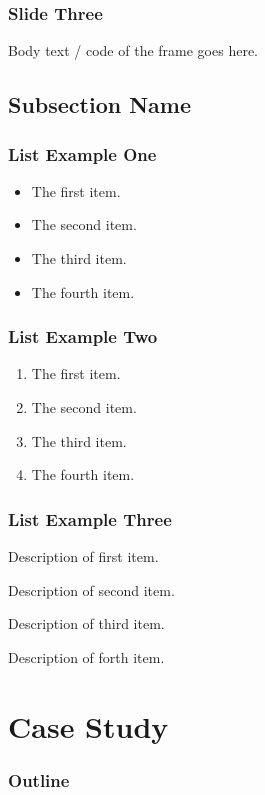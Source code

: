 \documentclass{beamer}
\begin{document}
\begin{frame}
\frametitle{Slide Three} 
Body text / code of the frame goes here. 
\end{frame} 


\subsection{Subsection Name}

\begin{frame}
\frametitle{List Example One}
\begin{itemize} 
\item The first item.
\item The second item.
\item The third item.
\item The fourth item.
\end{itemize}
\end{frame}

\begin{frame}
\frametitle{List Example Two}
\begin{enumerate} 
\item The first item.
\item The second item.
\item The third item.
\item The fourth item.
\end{enumerate}
\end{frame}

\begin{frame}
\frametitle{List Example Three}
\begin{description} 
\item[First Item] Description of first item.
\item[Second Item] Description of second item.
\item[Third Item] Description of third item.
\item[Forth Item] Description of forth item.
\end{description}
\end{frame}






\section{Case Study}
\begin{frame} 
\frametitle{Outline} \tableofcontents[currentsection]
\end{frame}
\end{document}
